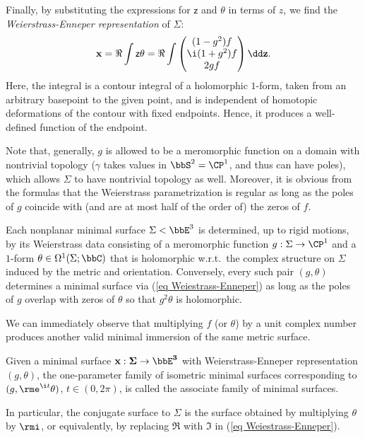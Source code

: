 Finally, by substituting the expressions for $\mathsf{z}$ and $\theta$ in terms of $z$, we find the \emph{Weierstrass-Enneper representation} of $\Sigma$:
\[\bf{x}=\Re\int \mathsf{z}\theta=\Re\int 
\begin{pmatrix}
    (1-g^2)f\\ \i (1+g^2)f\\ 2gf
\end{pmatrix}\dd z.\label{eq Weiestrass-Enneper}\]
Here, the integral is a contour integral of a holomorphic $1$-form, taken from an arbitrary basepoint to the given point, and is independent of homotopic deformations of the contour with fixed endpoints. Hence, it produces a well-defined function of the endpoint. 

Note that, generally, $g$ is allowed to be a meromorphic function on a domain with nontrivial topology ($\gamma$ takes values in $\bbS^2=\CP^1$, and thus can have poles), which allows $\Sigma$ to have nontrivial topology as well. Moreover, it is obvious from the formulas that the Weierstrass parametrization is regular as long as the poles of $g$ coincide with (and are at most half of the order of) the zeros of $f$.

\begin{cor}
    Each nonplanar minimal surface $\Sigma<\bbE^3$ is determined, up to rigid motions, by its Weierstrass data consisting of a meromorphic function $g:\Sigma\to \CP^1$ and a $1$-form $\theta\in\Omega^1(\Sigma;\bbC)$ that is holomorphic w.r.t.\ the complex structure on $\Sigma$ induced by the metric and orientation. Conversely, every such pair $(g,\theta)$ determines a minimal surface via (\ref{eq Weiestrass-Enneper}) as long as the poles of $g$ overlap with zeros of $\theta$ so that $g^2\theta$ is holomorphic.
\end{cor}

We can immediately observe that multiplying $f$ (or $\theta$) by a unit complex number produces another valid minimal immersion of the same metric surface.

\begin{defn}
    Given a minimal surface $\bf{x}:\Sigma\to \bbE^3$ with Weierstrass-Enneper representation $(g,\theta)$, the one-parameter family of isometric minimal surfaces corresponding to $(g,\rme^{\i t}\theta)$, $t\in (0,2\pi)$, is called the associate family of minimal surfaces.
    
    In particular, the conjugate surface to $\Sigma$ is the surface obtained by multiplying $\theta$ by $\rmi$, or equivalently, by replacing $\Re$ with $\Im$ in (\ref{eq Weiestrass-Enneper}).
\end{defn}

